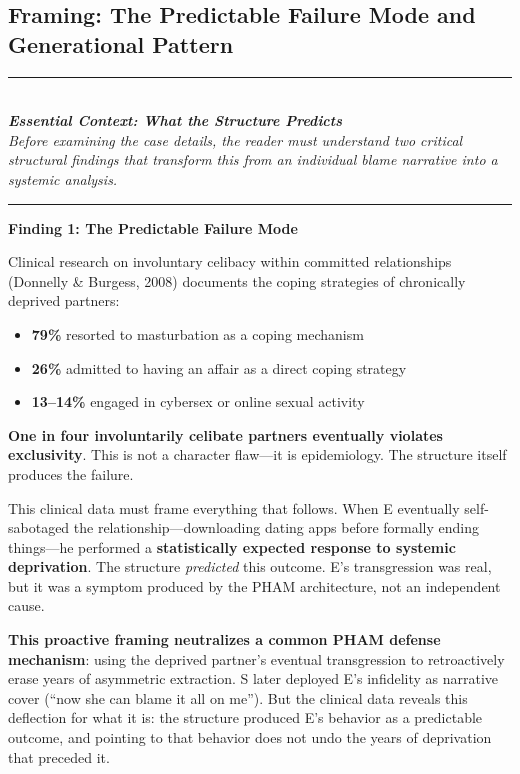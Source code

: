 \documentclass[12pt,openany]{book}
\numberwithin{equation}{chapter}
\begin{document}
\subsection{Framing: The Predictable Failure Mode and Generational Pattern}

\begin{center}
\rule{0.6\textwidth}{0.4pt}\\[0.5em]
\textit{\textbf{Essential Context: What the Structure Predicts}}\\[0.3em]
\textit{Before examining the case details, the reader must understand two critical structural findings that transform this from an individual blame narrative into a systemic analysis.}\\[0.5em]
\rule{0.6\textwidth}{0.4pt}
\end{center}

\textbf{Finding 1: The Predictable Failure Mode}

Clinical research on involuntary celibacy within committed relationships (Donnelly \& Burgess, 2008) documents the coping strategies of chronically deprived partners:

\begin{itemize}
    \item \textbf{79\%} resorted to masturbation as a coping mechanism
    \item \textbf{26\%} admitted to having an affair as a direct coping strategy
    \item \textbf{13--14\%} engaged in cybersex or online sexual activity
\end{itemize}

\textbf{One in four involuntarily celibate partners eventually violates exclusivity}. This is not a character flaw---it is epidemiology. The structure itself produces the failure.

This clinical data must frame everything that follows. When E eventually self-sabotaged the relationship---downloading dating apps before formally ending things---he performed a \textbf{statistically expected response to systemic deprivation}. The structure \textit{predicted} this outcome. E's transgression was real, but it was a symptom produced by the PHAM architecture, not an independent cause.

\textbf{This proactive framing neutralizes a common PHAM defense mechanism}: using the deprived partner's eventual transgression to retroactively erase years of asymmetric extraction. S later deployed E's infidelity as narrative cover (``now she can blame it all on me''). But the clinical data reveals this deflection for what it is: the structure produced E's behavior as a predictable outcome, and pointing to that behavior does not undo the years of deprivation that preceded it.
\end{document}
